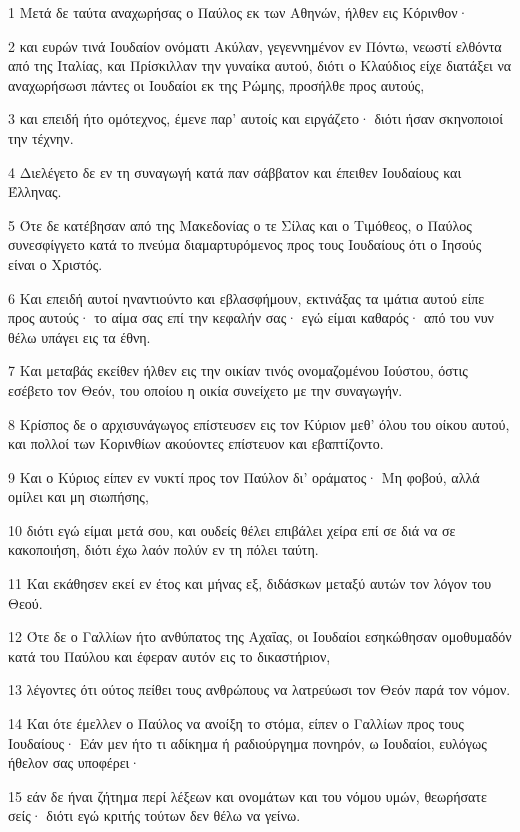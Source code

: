 \par 1 Μετά δε ταύτα αναχωρήσας ο Παύλος εκ των Αθηνών, ήλθεν εις Κόρινθον·
\par 2 και ευρών τινά Ιουδαίον ονόματι Ακύλαν, γεγεννημένον εν Πόντω, νεωστί ελθόντα από της Ιταλίας, και Πρίσκιλλαν την γυναίκα αυτού, διότι ο Κλαύδιος είχε διατάξει να αναχωρήσωσι πάντες οι Ιουδαίοι εκ της Ρώμης, προσήλθε προς αυτούς,
\par 3 και επειδή ήτο ομότεχνος, έμενε παρ' αυτοίς και ειργάζετο· διότι ήσαν σκηνοποιοί την τέχνην.
\par 4 Διελέγετο δε εν τη συναγωγή κατά παν σάββατον και έπειθεν Ιουδαίους και Έλληνας.
\par 5 Ότε δε κατέβησαν από της Μακεδονίας ο τε Σίλας και ο Τιμόθεος, ο Παύλος συνεσφίγγετο κατά το πνεύμα διαμαρτυρόμενος προς τους Ιουδαίους ότι ο Ιησούς είναι ο Χριστός.
\par 6 Και επειδή αυτοί ηναντιούντο και εβλασφήμουν, εκτινάξας τα ιμάτια αυτού είπε προς αυτούς· το αίμα σας επί την κεφαλήν σας· εγώ είμαι καθαρός· από του νυν θέλω υπάγει εις τα έθνη.
\par 7 Και μεταβάς εκείθεν ήλθεν εις την οικίαν τινός ονομαζομένου Ιούστου, όστις εσέβετο τον Θεόν, του οποίου η οικία συνείχετο με την συναγωγήν.
\par 8 Κρίσπος δε ο αρχισυνάγωγος επίστευσεν εις τον Κύριον μεθ' όλου του οίκου αυτού, και πολλοί των Κορινθίων ακούοντες επίστευον και εβαπτίζοντο.
\par 9 Και ο Κύριος είπεν εν νυκτί προς τον Παύλον δι' οράματος· Μη φοβού, αλλά ομίλει και μη σιωπήσης,
\par 10 διότι εγώ είμαι μετά σου, και ουδείς θέλει επιβάλει χείρα επί σε διά να σε κακοποιήση, διότι έχω λαόν πολύν εν τη πόλει ταύτη.
\par 11 Και εκάθησεν εκεί εν έτος και μήνας εξ, διδάσκων μεταξύ αυτών τον λόγον του Θεού.
\par 12 Ότε δε ο Γαλλίων ήτο ανθύπατος της Αχαΐας, οι Ιουδαίοι εσηκώθησαν ομοθυμαδόν κατά του Παύλου και έφεραν αυτόν εις το δικαστήριον,
\par 13 λέγοντες ότι ούτος πείθει τους ανθρώπους να λατρεύωσι τον Θεόν παρά τον νόμον.
\par 14 Και ότε έμελλεν ο Παύλος να ανοίξη το στόμα, είπεν ο Γαλλίων προς τους Ιουδαίους· Εάν μεν ήτο τι αδίκημα ή ραδιούργημα πονηρόν, ω Ιουδαίοι, ευλόγως ήθελον σας υποφέρει·
\par 15 εάν δε ήναι ζήτημα περί λέξεων και ονομάτων και του νόμου υμών, θεωρήσατε σείς· διότι εγώ κριτής τούτων δεν θέλω να γείνω.
